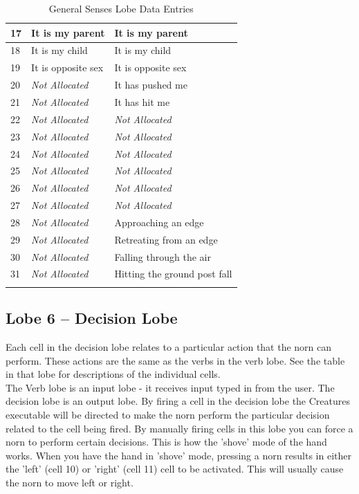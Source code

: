 \documentclass[11pt,twoside,a4paper]{article}
\begin{document}
\begin{longtable}{|p{}|p{}|p{}|}
17	&	It is my parent		&	It is my parent		 \\ \hline
18	&	It is my child		&	It is my child		 \\ \hline
19	&	It is opposite sex	&	It is opposite sex	 \\ \hline
20	&	\emph{Not Allocated}	&	It has pushed me	 \\ \hline
21	&	\emph{Not Allocated}	&	It has hit me		 \\ \hline
22	&	\emph{Not Allocated}	&	\emph{Not Allocated}	 \\ \hline
23	&	\emph{Not Allocated}	&	\emph{Not Allocated}	 \\ \hline
24	&	\emph{Not Allocated}	&	\emph{Not Allocated}	 \\ \hline
25	&	\emph{Not Allocated}	&	\emph{Not Allocated}	 \\ \hline
26	&	\emph{Not Allocated}	&	\emph{Not Allocated}	 \\ \hline
27	&	\emph{Not Allocated}	&	\emph{Not Allocated}	 \\ \hline
28	&	\emph{Not Allocated}	&	Approaching an edge	 \\ \hline
29	&	\emph{Not Allocated}	&	Retreating from an edge	 \\ \hline
30	&	\emph{Not Allocated}	&	Falling through the air	 \\ \hline
31	&	\emph{Not Allocated}	&	Hitting the ground post fall	 \\ \hline
	\caption{General Senses Lobe Data Entries }
	\label{tab:General_Senses_Lobe_Data_Entries}\\
\end{longtable}

\subsection{Lobe 6 -- Decision Lobe}

Each cell in the decision lobe relates to a particular action that the norn can perform. These actions are the same as the verbs in the verb lobe. See the table in that lobe for descriptions of the individual cells.~\\

The Verb lobe is an input lobe - it receives input typed in from the user. The decision lobe is an output lobe. By firing a cell in the decision lobe the Creatures executable will be directed to make the norn perform the particular decision related to the cell being fired. By manually firing cells in this lobe you can force a norn to perform certain decisions. This is how the 'shove' mode of the hand works. When you have the hand in 'shove' mode, pressing a norn results in either the 'left' (cell 10) or 'right' (cell 11) cell to be activated. This will usually cause the norn to move left or right.~\\
\end{document}
